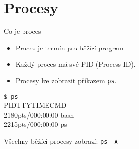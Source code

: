 \documentclass{beamer}
\begin{document}
\section{Procesy}

\begin{frame}[fragile]{Co je proces}
	\begin{itemize}
		\item Proces je termín pro běžící program
		\item Každý proces má své PID (Process ID).
		\item Procesy lze zobrazit příkazem \texttt{ps}.
	\end{itemize}
	\vspace{0.5em}
	\hspace{2em}\texttt{\$ ps} \\
	\hspace{2em}PID\hspace{3em}TTY\hspace{2em}TIME\hspace{2em}CMD \\
	\hspace{2em}2180\hspace{2em}pts/0\hspace{1em}00:00:00 bash \\
	\hspace{2em}2215\hspace{2em}pts/0\hspace{1em}00:00:00 ps
	
	\vspace{2.5em}	
	\hspace{2em}Všechny běžící procesy zobrazí: \texttt{ps -A}
\end{frame}
\end{document}
